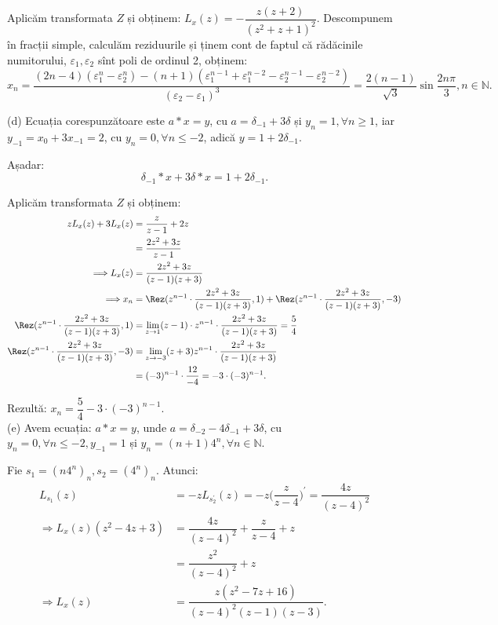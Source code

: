 Aplicăm transformata $Z$ și obținem: 
$L_x(z) = - \dfrac{z(z+2)}{(z^2 + z + 1)^2}$. Descompunem în fracții 
simple, calculăm reziduurile și ținem cont de faptul că rădăcinile numitorului, 
$\varepsilon_1, \varepsilon_2$ sînt poli de ordinul 2, obținem: 
\[
    x_n = \dfrac{(2n-4)(\varepsilon_1^n - \varepsilon_2^n) - 
        (n+1)(\varepsilon_1^{n-1} + \varepsilon_1^{n-2} - \varepsilon_2^{n-1} - 
    \varepsilon_2^{n-2})}{(\varepsilon_2 - \varepsilon_1)^3} 
    = \dfrac{2(n-1)}{\sqrt{3}} \sin \dfrac{2 n \pi}{3}, n \in \mathbb{N}.
\]

(d) Ecuația corespunzătoare este $a \ast x = y$, cu $a = \delta_{-1} + 3 \delta$ și 
$y_n = 1, \forall n \geq 1$, iar $y_{-1} = x_0 + 3 x_{-1} = 2$, cu 
$y_n = 0, \forall n \leq -2$, adică $y = 1 + 2 \delta_{-1}$.

Așadar: 
\[
    \delta_{-1} \ast x + 3 \delta \ast x = 1 + 2 \delta_{-1}.
\]

Aplicăm transformata $Z$ și obținem:
\begin{align*}
    z L_x(z) + 3 L_x(z) &= \dfrac{z}{z-1} + 2z \\
                        &= \dfrac{2z^2 + 3z}{z-1} \\
    \Longrightarrow L_x(z) &= \dfrac{2z^2 + 3z}{(z-1)(z+3)} \\
    \Longrightarrow x_n &= \Rez(z^{n-1} \cdot \dfrac{2z^2 + 3z}{(z-1)(z+3)}, 1) + 
    \Rez (z^{n-1} \cdot \dfrac{2z^2 + 3z}{(z-1)(z+3)}, -3) \\
    \Rez(z^{n-1} \cdot \dfrac{2z^2 + 3z}{(z-1)(z+3)}, 1) &= \lim_{z \to 1} (z-1) 
    \cdot z^{n-1} \cdot \dfrac{2z^2 + 3z}{(z-1)(z+3)} = \dfrac{5}{4} \\
    \Rez(z^{n-1} \cdot \dfrac{2z^2 + 3z}{(z-1)(z+3)}, -3) 
                                                         &= \lim_{z \to -3} (z+3) z^{n-1} \cdot \dfrac{2z^2 + 3z}{(z-1)(z+3)} \\
                                                         &= (-3)^{n-1} \cdot \dfrac{12}{-4} = -3 \cdot (-3)^{n-1}.	                              
\end{align*}

Rezultă: $x_n = \dfrac{5}{4} - 3 \cdot (-3)^{n-1}$. \\

(e) Avem ecuația: $a \ast x = y$, unde 
$a = \delta_{-2} - 4 \delta_{-1} + 3 \delta$, cu 
$y_n = 0, \forall n \leq -2, y_{-1} = 1$ și 
$y_n = (n+1)4^n, \forall n \in \mathbb{N}$.

Fie $s_1 = (n4^n)_n, s_2 = (4^n)_n$. Atunci:
\begin{align*}
    L_{s_1}(z) &= -z L_{s_2^{\prime}}(z) 
    = - z \big( \dfrac{z}{z-4} \big)^{\prime} = \dfrac{4z}{(z-4)^2} \\
    \Longrightarrow L_x(z)(z^2 - 4z + 3) 
               &= \dfrac{4z}{(z-4)^2} + \dfrac{z}{z-4} + z \\
               &= \dfrac{z^2}{(z-4)^2} + z \\
    \Longrightarrow  L_x(z) &= \dfrac{z(z^2 - 7z + 16)}{(z-4)^2 (z-1) (z-3)}.
\end{align*}

